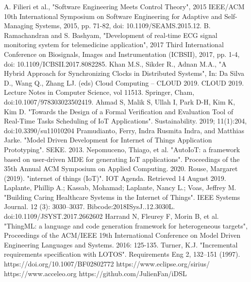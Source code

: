 \documentclass[11pt, oneside]{article}   	%
\begin{document}
\begin{thebibliography}{99}
A. Filieri et al., "Software Engineering Meets Control Theory", 2015 IEEE/ACM 10th International Symposium on Software Engineering for Adaptive and Self-Managing Systems, 2015, pp. 71-82, doi: 10.1109/SEAMS.2015.12.
B. Ramachandran and S. Bashyam, "Development of real-time ECG signal monitoring system for telemedicine application", 2017 Third International Conference on Biosignals, Images and Instrumentation (ICBSII), 2017, pp. 1-4, doi: 10.1109/ICBSII.2017.8082285.
Khan M.S., Sikder R., Adnan M.A., "A Hybrid Approach for Synchronizing Clocks in Distributed Systems", In: Da Silva D., Wang Q., Zhang LJ. (eds) Cloud Computing – CLOUD 2019. CLOUD 2019. Lecture Notes in Computer Science, vol 11513. Springer, Cham, doi:10.1007/978303023502419.
Ahmad S, Malik S, Ullah I, Park D-H, Kim K, Kim D. "Towards the Design of a Formal Verification and Evaluation Tool of Real-Time Tasks Scheduling of IoT Applications". Sustainability. 2019; 11(1):204, doi:10.3390/su11010204
Pramudianto, Ferry, Indra Rusmita Indra, and Matthias Jarke. "Model Driven Development for Internet of Things Application Prototyping". SEKE. 2013.
Nepomuceno, Thiago, et al. "AutoIoT: a framework based on user-driven MDE for generating IoT applications". Proceedings of the 35th Annual ACM Symposium on Applied Computing. 2020.
Rouse, Margaret (2019). "internet of things (IoT)". IOT Agenda. Retrieved 14 August 2019.
Laplante, Phillip A.; Kassab, Mohamad; Laplante, Nancy L.; Voas, Jeffrey M. "Building Caring Healthcare Systems in the Internet of Things". IEEE Systems Journal. 12 (3): 3030–3037. Bibcode:2018ISysJ..12.3030L. doi:10.1109/JSYST.2017.2662602
Harrand N, Fleurey F, Morin B, et al. "ThingML: a language and code generation framework for heterogeneous targets", Proceedings of the ACM/IEEE 19th International Conference on Model Driven Engineering Languages and Systems. 2016: 125-135.
Turner, K.J. "Incremental requirements specification with LOTOS". Requirements Eng 2, 132–151 (1997). https://doi.org/10.1007/BF02802772
https://www.eclipse.org/sirius/
https://www.acceleo.org
https://github.com/JulienFan/iDSL
\end{thebibliography}
\end{document}
